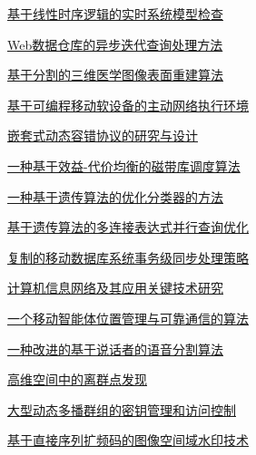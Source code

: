 \documentclass[a4paper]{article}
\begin{document}
\href{http://www.jos.org.cn/ch/reader/download_pdf.aspx?file_no=20020205&year_id=2002&quarter_id=2&falg=1}{基于线性时序逻辑的实时系统模型检查}

\href{http://www.jos.org.cn/ch/reader/download_pdf.aspx?file_no=20020207&year_id=2002&quarter_id=2&falg=1}{Web数据仓库的异步迭代查询处理方法}

\href{http://www.jos.org.cn/ch/reader/download_pdf.aspx?file_no=20020208&year_id=2002&quarter_id=2&falg=1}{基于分割的三维医学图像表面重建算法}

\href{http://www.jos.org.cn/ch/reader/download_pdf.aspx?file_no=20020209&year_id=2002&quarter_id=2&falg=1}{基于可编程移动软设备的主动网络执行环境}

\href{http://www.jos.org.cn/ch/reader/download_pdf.aspx?file_no=20020210&year_id=2002&quarter_id=2&falg=1}{嵌套式动态容错协议的研究与设计}

\href{http://www.jos.org.cn/ch/reader/download_pdf.aspx?file_no=20020211&year_id=2002&quarter_id=2&falg=1}{一种基于效益-代价均衡的磁带库调度算法}

\href{http://www.jos.org.cn/ch/reader/download_pdf.aspx?file_no=20020212&year_id=2002&quarter_id=2&falg=1}{一种基于遗传算法的优化分类器的方法}

\href{http://www.jos.org.cn/ch/reader/download_pdf.aspx?file_no=20020213&year_id=2002&quarter_id=2&falg=1}{基于遗传算法的多连接表达式并行查询优化}

\href{http://www.jos.org.cn/ch/reader/download_pdf.aspx?file_no=20020214&year_id=2002&quarter_id=2&falg=1}{复制的移动数据库系统事务级同步处理策略}

\href{http://www.jos.org.cn/ch/reader/download_pdf.aspx?file_no=20020215&year_id=2002&quarter_id=2&falg=1}{计算机信息网络及其应用关键技术研究}

\href{http://www.jos.org.cn/ch/reader/download_pdf.aspx?file_no=20020216&year_id=2002&quarter_id=2&falg=1}{一个移动智能体位置管理与可靠通信的算法}

\href{http://www.jos.org.cn/ch/reader/download_pdf.aspx?file_no=20020217&year_id=2002&quarter_id=2&falg=1}{一种改进的基于说话者的语音分割算法}

\href{http://www.jos.org.cn/ch/reader/download_pdf.aspx?file_no=20020218&year_id=2002&quarter_id=2&falg=1}{高维空间中的离群点发现}

\href{http://www.jos.org.cn/ch/reader/download_pdf.aspx?file_no=20020219&year_id=2002&quarter_id=2&falg=1}{大型动态多播群组的密钥管理和访问控制}

\href{http://www.jos.org.cn/ch/reader/download_pdf.aspx?file_no=20020220&year_id=2002&quarter_id=2&falg=1}{基于直接序列扩频码的图像空间域水印技术}
\end{document}
